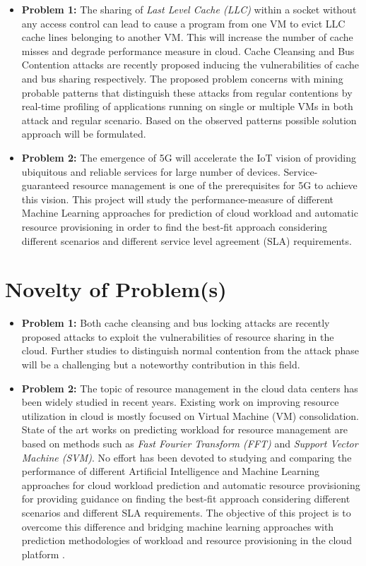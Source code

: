 \documentclass[a4paper,10pt]{article}
\begin{document}
\begin{itemize}
    \item \textbf{Problem 1:} The sharing of \textit{Last Level Cache (LLC)} within a socket without any access control can lead to cause a program from one VM to evict LLC cache lines belonging to another VM. This will increase the number of cache misses and degrade performance measure in cloud. Cache Cleansing and Bus Contention attacks\cite{cacheCleansing} are recently proposed inducing the vulnerabilities of cache and bus sharing respectively. The proposed problem concerns with mining probable patterns that distinguish these attacks from regular contentions by real-time profiling of applications running on single or multiple VMs in both attack and regular scenario. Based on the observed patterns possible solution approach will be formulated. 
    \item \textbf{Problem 2:} The emergence of 5G will accelerate the IoT vision of providing ubiquitous and reliable services for large number of devices. Service-guaranteed resource management is one of the prerequisites for 5G to achieve this vision. This project will study the performance-measure of different Machine Learning approaches for prediction of cloud workload and automatic resource provisioning in order to find the best-fit approach considering different scenarios and different service level agreement (SLA) requirements\cite{proposalHuawei}. 
\end{itemize}

\smallskip

\section{Novelty of Problem(s)}

\begin{itemize}
    \item \textbf{Problem 1:} Both cache cleansing and bus locking attacks are recently proposed attacks to exploit the vulnerabilities of resource sharing in the cloud. Further studies to distinguish normal contention from the attack phase will be a challenging but a noteworthy contribution in this field.
    \item \textbf{Problem 2:} The topic of resource management in the cloud data centers has been widely studied in recent years. Existing work on improving resource utilization in cloud is mostly focused on Virtual Machine (VM) consolidation. State of the art works on predicting workload for resource management are based on methods such as \textit{Fast Fourier Transform (FFT)} and \textit{Support Vector Machine (SVM)}. No effort has been devoted to studying and comparing the performance of different Artificial Intelligence and Machine Learning approaches for cloud workload prediction and automatic resource provisioning for providing guidance on finding the best-fit approach considering different scenarios and different SLA requirements. The objective of this project is to overcome this difference and bridging machine learning approaches with prediction methodologies of workload and resource provisioning in the cloud platform \cite{proposalHuawei}. 
\end{itemize}
\end{document}
